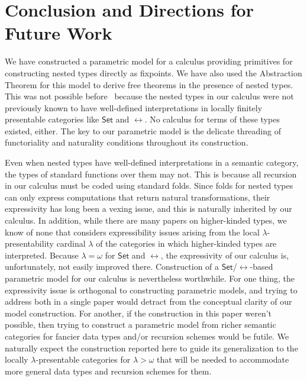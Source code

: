 \documentclass[runningheads]{llncs}
\newcommand{\set}{\mathsf{Set}}
\begin{document}
\section{Conclusion and Directions for Future Work}\label{sec:conclusion}

We have constructed a parametric model for a calculus
providing primitives for constructing nested types directly as
fixpoints.
We have also used the Abstraction Theorem for this model to derive
free theorems in the presence of nested types. This was not possible
before~\cite{jp19} because the nested types in our calculus were not
previously known to have well-defined interpretations in locally
finitely presentable categories like $\set$ and $\rel$. No calculus
for terms of these types existed, either. The key to our parametric
model is
the delicate threading of functoriality and 
naturality conditions throughout its construction.

Even when nested types have well-defined interpretations in a semantic
category, the types of standard functions over them may not. This is
because all recursion in our calculus must be coded using standard
folds.  Since folds for nested types can only express computations
that return natural transformations, their expressivity has long been
a vexing issue, and this is naturally inherited by our calculus.
In addition, while there are many papers on higher-kinded types, we
know of none that considers expressibility issues arising from the
local $\lambda$-presentability cardinal $\lambda$ of the categories in
which higher-kinded types are interpreted. Because $\lambda = \omega$
for $\set$ and $\rel$, the expressivity of our
calculus is, unfortunately, not easily improved there. Construction of
a $\set$/$\rel$-based parametric model for our calculus is
nevertheless worthwhile.  For one thing, the expressivity issue is
orthogonal to constructing parametric models,
and trying to address both in a single paper would
detract from the conceptual clarity of our model construction.
%
For another, if the construction in this paper
weren't possible, then trying to construct a parametric model from
richer semantic categories for fancier data types and/or recursion
schemes would be futile. We naturally expect the construction reported
here to guide its generalization to the locally $\lambda$-presentable
categories for $\lambda > \omega$ that will be needed to accommodate
more general data types and recursion schemes for them.
\end{document}
